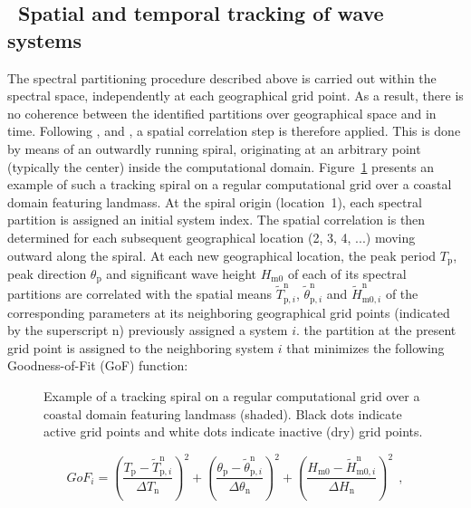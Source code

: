 \vssub
\subsection{~Spatial and temporal tracking of wave systems} \label{sub:num_track}

\noindent
The spectral partitioning procedure described above is carried out within the
spectral space, independently at each geographical grid point. As a result,
there is no coherence between the identified partitions over geographical
space and in time. Following \cite{art:VMH97}, \cite{art:HP01} and
\cite{pro:DHL09}, a spatial correlation step is therefore applied.  This is
done by means of an outwardly running spiral, originating at an arbitrary
point (typically the center) inside the computational domain.
Figure~\ref{fig:wavetrack} presents an example of such a tracking spiral on a
regular computational grid over a coastal domain featuring landmass. At the
spiral origin (location~1), each spectral partition is assigned an initial
system index. The spatial correlation is then determined for each subsequent
geographical location (2, 3, 4, ...) moving outward along the spiral.  At each
new geographical location, the peak period $T_\mathrm{p}$, peak direction
$\theta_\mathrm{p}$ and significant wave height $H_\mathrm{m0}$ of each of its
spectral partitions are correlated with the spatial means
$\tilde{T}^\mathrm{n}_{\mathrm{p},i}$,
$\tilde{\theta}^\mathrm{n}_{\mathrm{p},i}$ and
$\tilde{H}^\mathrm{n}_{\mathrm{m0},i}$ of the corresponding parameters at its
neighboring geographical grid points (indicated by the superscript
$\mathrm{n}$) previously assigned a system $i$. the partition at the present
grid point is assigned to the neighboring system $i$ that minimizes the
following Goodness-of-Fit (GoF) function:

\begin{figure} \begin{center}
\caption{Example of a tracking spiral on a regular computational grid 
over a coastal domain featuring landmass (shaded). Black dots indicate 
active grid points and white dots indicate inactive (dry) grid points.}
         \label{fig:wavetrack} \botline
\end{center}
\end{figure}

\begin{equation}
    GoF_{i} = {\left( \frac{T_\mathrm{p} - \tilde{T}^\mathrm{n}_{\mathrm{p},i}}{\Delta T_\mathrm{n}} \right)}^2 + 
                     {\left( \frac{\theta_\mathrm{p} - \tilde{\theta}^\mathrm{n}_{\mathrm{p},i}}{\Delta\theta_\mathrm{n}} \right)}^2 +
                     {\left( \frac{H_\mathrm{m0} - \tilde{H}^\mathrm{n}_{\mathrm{m0},i}}{\Delta H_\mathrm{n}} \right)}^2\ \ ,
\label{eq:grdgof}
\end{equation} 

